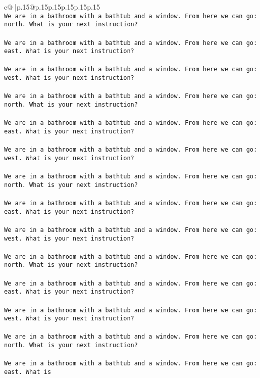 \documentclass{article}
\begin{document}
{\begin{supertabular}{c@{$\;$}|p{.15\linewidth}@{}p{.15\linewidth}p{.15\linewidth}p{.15\linewidth}p{.15\linewidth}p{.15\linewidth}}
{{{\tt \\ \tt We are in a bathroom with a bathtub and a window. From here we can go: north. What is your next instruction?\\ \tt \\ \tt We are in a bathroom with a bathtub and a window. From here we can go: east. What is your next instruction?\\ \tt \\ \tt We are in a bathroom with a bathtub and a window. From here we can go: west. What is your next instruction?\\ \tt \\ \tt We are in a bathroom with a bathtub and a window. From here we can go: north. What is your next instruction?\\ \tt \\ \tt We are in a bathroom with a bathtub and a window. From here we can go: east. What is your next instruction?\\ \tt \\ \tt We are in a bathroom with a bathtub and a window. From here we can go: west. What is your next instruction?\\ \tt \\ \tt We are in a bathroom with a bathtub and a window. From here we can go: north. What is your next instruction?\\ \tt \\ \tt We are in a bathroom with a bathtub and a window. From here we can go: east. What is your next instruction?\\ \tt \\ \tt We are in a bathroom with a bathtub and a window. From here we can go: west. What is your next instruction?\\ \tt \\ \tt We are in a bathroom with a bathtub and a window. From here we can go: north. What is your next instruction?\\ \tt \\ \tt We are in a bathroom with a bathtub and a window. From here we can go: east. What is your next instruction?\\ \tt \\ \tt We are in a bathroom with a bathtub and a window. From here we can go: west. What is your next instruction?\\ \tt \\ \tt We are in a bathroom with a bathtub and a window. From here we can go: north. What is your next instruction?\\ \tt \\ \tt We are in a bathroom with a bathtub and a window. From here we can go: east. What is 
	  } 
	   } 
	   } 
	  \\ 
 


\end{supertabular}}
\end{document}
